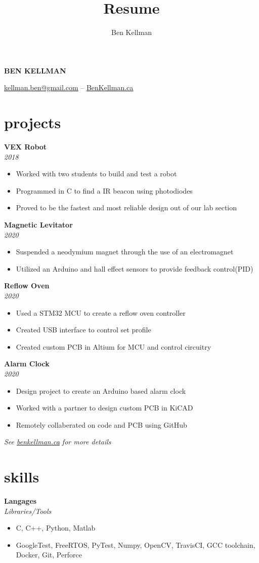 \documentclass{article}
\author{Ben Kellman}
\title{Resume}
\newcommand{\minicolumns}[2]{
  \begin{minipage}[t]{0.25\textwidth}
    \begin{flushright}
      #1
    \end{flushright}
  \end{minipage}
  \hfill    
  \begin{minipage}[t]{0.7\textwidth}
    #2
  \end{minipage}   
}
\newcommand{\resumeSection}[3]{
  \minicolumns{
      \textbf{#1}\\          
      \textit{#2}
    }
    {  
      \begin{itemize}[leftmargin=*]
          \setlength\itemsep{-0.1em}
          #3
      \end{itemize}
  }
  \vspace{1em}
}
\begin{document}
\begin{center}
  {\bfseries \LARGE \MakeUppercase{Ben Kellman}}
  
  \vspace{0.75em}
  \underline{\href{mailto: kellman.ben@gmail.com}{kellman.ben@gmail.com}} -- \underline{\href{www.BenKellman.ca}{BenKellman.ca}}

\end{center}
\vspace{1em}

\begin{minipage}[t]{0.65\textwidth}
  \section{projects}
  
  \resumeSection{VEX Robot}{2018}{
      \item Worked with two students to build and test a robot
      \item Programmed in C to find a IR beacon using photodiodes
      \item Proved to be the fastest and most reliable design out of our lab section 
  }

  \resumeSection{Magnetic Levitator}{2020}{
      \item Suspended a neodymium magnet through the use of an electromagnet
      \item Utilized an Arduino and hall effect sensors to provide feedback control(PID)
  }

  \resumeSection{Reflow Oven}{2020}{
      \item Used a STM32 MCU to create a reflow oven controller
      \item Created USB interface to control set profile
      \item Created custom PCB in Altium for MCU and control circuitry
  }

  \resumeSection{Alarm Clock}{2020}{
      \item Design project to create an Arduino based alarm clock
      \item Worked with a partner to design custom PCB in KiCAD
      \item Remotely collaberated on code and PCB using GitHub
  }
  
  \textit{See \underline{\href{www.benkellman.ca}{benkellman.ca}} for more details}

  \section{skills}
  \resumeSection{Langages}{Libraries/Tools}{
    \item C, C++, Python, Matlab
    \item GoogleTest, FreeRTOS, PyTest, Numpy, OpenCV, TravisCI, GCC toolchain, Docker, Git, Perforce
  }


\end{minipage}
\end{document}
